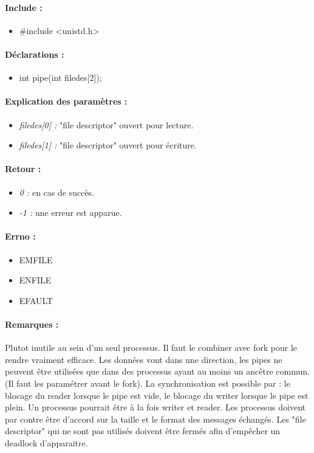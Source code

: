\documentclass{article}[12pt]
\begin{document}
\paragraph{Include : }
\begin{itemize}
	\item \#include <unistd.h>
\end{itemize}
\paragraph{Déclarations : }
\begin{itemize}
	\item int pipe(int filedes[2]);
\end{itemize}
\paragraph{Explication des paramètres : }
\begin{itemize}
	\item \emph{filedes[0] : } "file descriptor" ouvert pour lecture.
    \item \emph{filedes[1] : } "file descriptor" ouvert pour écriture.
\end{itemize}
\paragraph{Retour : }
\begin{itemize}
	\item \emph{0 : } en cas de succès.
	\item \emph{-1 : } une erreur est apparue.
\end{itemize}
\paragraph{Errno :}
\begin{itemize}
	\item EMFILE
    \item ENFILE
    \item EFAULT
\end{itemize}
\paragraph{Remarques : }
Plutot inutile au sein d'un seul processus. Il faut le combiner avec fork pour le rendre vraiment efficace. Les données vont dans une direction, les pipes ne peuvent être utilisées que dans des processus ayant au moins un ancêtre commun. (Il faut les paramétrer avant le fork). La synchronisation est possible par : le blocage du reader lorsque le pipe est vide, le blocage du writer lorsque le pipe est plein. Un processus pourrait être à la fois writer et reader. Les processus doivent par contre être d'accord sur la taille et le format des messages échangés. Les "file descriptor" qui ne sont pas utilisés doivent être fermés afin d'empêcher un deadlock d'apparaitre.
\end{document}
